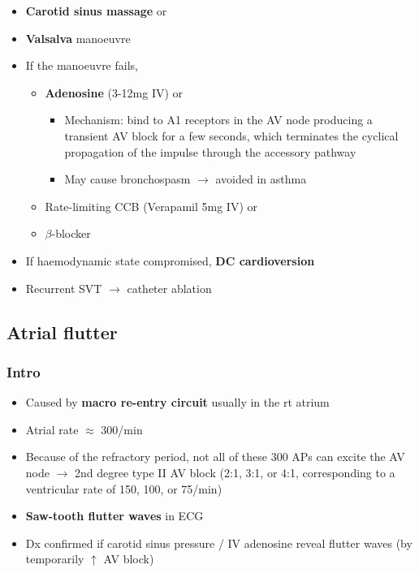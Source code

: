 \documentclass[
  12pt,
]{memoir}
\providecommand{\tightlist}{%
  \setlength{\itemsep}{0pt}\setlength{\parskip}{0pt}}
\begin{document}
\begin{itemize}
\tightlist
\item
  \textbf{Carotid sinus massage} or
\item
  \textbf{Valsalva} manoeuvre
\item
  If the manoeuvre fails,

  \begin{itemize}
  \tightlist
  \item
    \textbf{Adenosine} (3-12mg IV) or

    \begin{itemize}
    \tightlist
    \item
      Mechanism: bind to A1 receptors in the AV node producing a
      transient AV block for a few seconds, which terminates the
      cyclical propagation of the impulse through the accessory pathway
    \item
      May cause bronchospasm \(\rightarrow\) avoided in asthma
    \end{itemize}
  \item
    Rate-limiting CCB (Verapamil 5mg IV) or
  \item
    \(\beta\)-blocker
  \end{itemize}
\item
  If haemodynamic state compromised, \textbf{DC cardioversion}
\item
  Recurrent SVT \(\rightarrow\) catheter ablation
\end{itemize}

\hypertarget{atrial-flutter}{%
\subsection{Atrial flutter}\label{atrial-flutter}}

\hypertarget{intro}{%
\subsubsection{Intro}\label{intro}}

\begin{itemize}
\tightlist
\item
  Caused by \textbf{macro re-entry circuit} usually in the rt atrium
\item
  Atrial rate \(\approx\) 300/min
\item
  Because of the refractory period, not all of these 300 APs can excite
  the AV node \(\rightarrow\) 2nd degree type II AV block (2:1, 3:1, or
  4:1, corresponding to a ventricular rate of 150, 100, or 75/min)
\item
  \textbf{Saw-tooth flutter waves} in ECG
\item
  Dx confirmed if carotid sinus pressure / IV adenosine reveal flutter
  waves (by temporarily \(\uparrow\) AV block)
\end{itemize}
\end{document}
